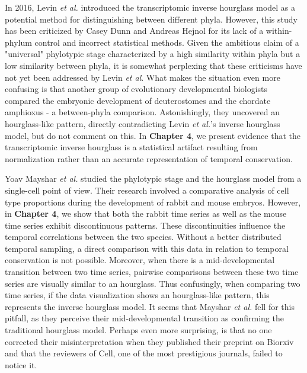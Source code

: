 In 2016, Levin \textit{et al.} introduced the transcriptomic inverse hourglass model as a potential method for distinguishing between different phyla\cite{Levin2016}. However, this study has been criticized by Casey Dunn and Andreas Hejnol for its lack of a within-phylum control\cite{hejnol2016} and incorrect statistical methods\cite{Dunn2018}. Given the ambitious claim of a "universal" phylotypic stage characterized by a high similarity within phyla but a low similarity between phyla, it is somewhat perplexing that these criticisms have not yet been addressed by Levin \textit{et al}. What makes the situation even more confusing is that another group of evolutionary developmental biologists compared the embryonic development of deuterostomes and the chordate amphioxus - a between-phyla comparison. Astonishingly, they uncovered an hourglass-like pattern\cite{PerezPosada2022}, directly contradicting Levin \textit{et al.}'s inverse hourglass model, but do not comment on this. In \textbf{Chapter 4}, we present evidence that the transcriptomic inverse hourglass is a statistical artifact resulting from normalization rather than an accurate representation of temporal conservation. 

Yoav Mayshar \textit{et al.} studied the phylotypic stage and the hourglass model from a single-cell point of view\cite{Mayshar2023}. Their research involved a comparative analysis of cell type proportions during the development of rabbit and mouse embryos. However, in \textbf{Chapter 4}, we show that both the rabbit time series as well as the mouse time series exhibit discontinuous patterns. These discontinuities influence the temporal correlations between the two species. Without a better distributed temporal sampling, a direct comparison with this data in relation to temporal conservation is not possible. Moreover, when there is a mid-developmental transition between two time series, pairwise comparisons between these two time series are visually similar to an hourglass. Thus confusingly, when comparing two time series, if the data visualization shows an hourglass-like pattern, this represents the inverse hourglass model. It seems that Mayshar \textit{et al.} fell for this pitfall, as they perceive their mid-developmental transition as confirming the traditional hourglass model. Perhaps even more surprising, is that no one corrected their misinterpretation when they published their preprint on Biorxiv and that the reviewers of Cell, one of the most prestigious journals, failed to notice it.

